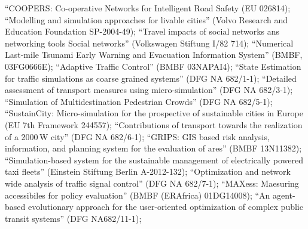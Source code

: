 ``COOPERS: Co-operative Networks for Intelligent Road Safety (EU 026814);
``Modelling and simulation approaches for livable cities'' (Volvo Research and Education Foundation SP-2004-49);
``Travel impacts of social networks ans networking  tools Social networks'' (Volkswagen Stiftung I/82 714);
``Numerical Last-mile Tsunami Early Warning and Evacuation Information System'' (BMBF, 03FG0666E);
``Adaptive Traffic Control'' (BMBF 03NAPAI4);
``State Estimation for traffic simulations as coarse grained systems'' (DFG NA 682/1-1);
``Detailed assessment of transport measures using micro-simulation'' (DFG NA 682/3-1);
``Simulation of Multidestination Pedestrian Crowds'' (DFG NA 682/5-1);
``SustainCity: Micro-simulation for the prospective of sustainable cities in Europe (EU 7th Framework 244557);
``Contributions of transport towards the realization of a 2000\,W city'' (DFG NA 682/6-1);
``GRIPS: GIS based risk analysis, information, and planning system for the evaluation of ares'' (BMBF 13N11382);
``Simulation-based system for the sustainable management of electrically powered taxi fleets'' (Einstein Stiftung Berlin A-2012-132);
``Optimization and network wide analysis of traffic signal control'' (DFG NA 682/7-1);
``MAXess: Maesuring accessibiles for policy evaluation'' (BMBF (ERAfrica) 01DG14008); 
``An agent-based evolutionary approach for the user-oriented optimization of complex public transit systems'' (DFG NA682/11-1);

